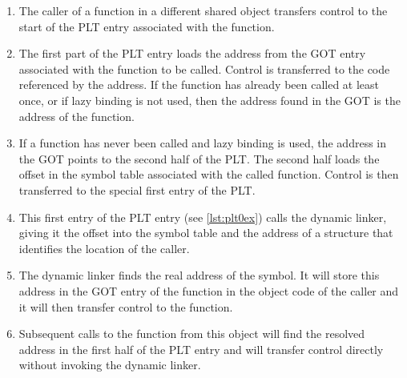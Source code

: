 \documentclass[USenglish,fontsize=11pt,twoside,%
  toc=bib,toc=idx,toc=graduated,numbers=noendperiod,
  bookmarks=true,
  bookmarksnumbered=true,
  bookmarksopen=true,
  bookmarksopenlevel=1,
  breaklinks=true,
  colorlinks=true,
  linkcolor=black,
  pdfpagelayout={TwoPageRight},
  pdfusetitle=true
]{scrreprt}
\begin{document}
\begin{enumerate}
\item The caller of a function in a different shared object transfers
  control to the start of the PLT entry associated with the function.
\item The first part of the PLT entry loads the address from the GOT
  entry associated with the function to be called.  Control is
  transferred to the code referenced by the address.  If the function
  has already been called at least once, or if lazy binding is not used,
  then the address found in the GOT is the address of the function.
\item If a function has never been called and lazy binding is used,
  the address in the GOT points to the second half of the PLT\@.
  The second half loads the offset in the symbol table associated with
  the called function.  Control is then transferred to the special
  first entry of the PLT\@.
\item This first entry of the PLT entry (see \cref{lst:plt0ex})
  calls the dynamic linker, giving it the offset into the symbol table
  and the address of a structure that identifies the location of the
  caller.
\item The dynamic linker finds the real address of the symbol.  It
  will store this address in the GOT entry of the function in the
  object code of the caller and it will then transfer control to the
  function.
\item Subsequent calls to the function from this object will find the
  resolved address in the first half of the PLT entry and will
  transfer control directly without invoking the dynamic linker.
\end{enumerate}
\end{document}

